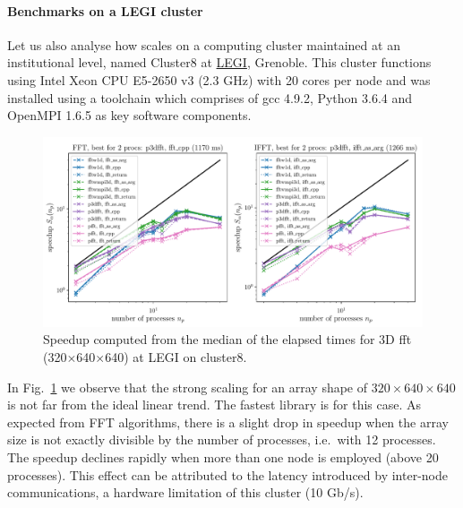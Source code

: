 \documentclass{../jors}
\begin{document}
\paragraph{Benchmarks on a LEGI cluster}

Let us also analyse how  scales on a computing cluster
maintained at an institutional level, named Cluster8 at \href{%
http://www.legi.grenoble-inp.fr}{LEGI}, Grenoble. This cluster functions using
Intel Xeon CPU E5-2650 v3 (2.3 GHz) with 20 cores per node and 
was installed using a toolchain which comprises of gcc 4.9.2, Python 3.6.4 and
OpenMPI 1.6.5 as key software components.

\begin{figure}[htp!]
\centering
\includegraphics[width=\linewidth]{tmp/fig_legi_cluster8_320x640x640}
\caption{Speedup computed from the median of the elapsed times for 3D fft
(320$\times$640$\times$640) at LEGI on cluster8.}
\label{fig:cluster8:320x640x640}
\end{figure}

In Fig.~\ref{fig:cluster8:320x640x640} we observe that the strong scaling for an
array shape of $320\times640\times640$ is not far from the ideal linear trend. The
fastest library is  for this case.  As expected from FFT
algorithms, there is a slight drop in speedup when the array size is not exactly
divisible by the number of processes, i.e.\ with 12 processes. The speedup
declines rapidly when more than one node is employed (above 20 processes). This
effect can be attributed to the latency introduced by inter-node communications, a
hardware limitation of this cluster (10 Gb/s).
\end{document}
